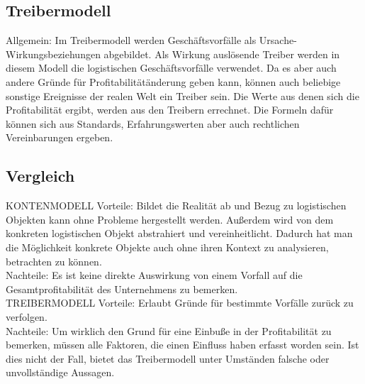 \subsection{Treibermodell}
Allgemein:
Im Treibermodell werden Geschäftsvorfälle als Ursache-Wirkungsbeziehungen abgebildet. Als Wirkung auslösende Treiber werden in diesem Modell die logistischen Geschäftsvorfälle verwendet. Da es aber auch andere Gründe für Profitabilitätänderung geben kann, können auch beliebige sonstige Ereignisse der realen Welt ein Treiber sein.
Die Werte aus denen sich die Profitabilität ergibt, werden aus den Treibern errechnet. Die Formeln dafür können sich aus Standards, Erfahrungswerten aber auch rechtlichen Vereinbarungen ergeben.

\subsection{Vergleich}
KONTENMODELL
Vorteile:
Bildet die Realität ab und Bezug zu logistischen Objekten kann ohne Probleme hergestellt werden. Außerdem wird von dem konkreten logistischen Objekt abstrahiert und vereinheitlicht. Dadurch hat man die Möglichkeit konkrete Objekte auch ohne ihren Kontext zu analysieren, betrachten zu können.
\\
Nachteile:
Es ist keine direkte Auswirkung von einem Vorfall auf die Gesamtprofitabilität des Unternehmens zu bemerken.
\\
TREIBERMODELL
Vorteile:
Erlaubt Gründe für bestimmte Vorfälle zurück zu verfolgen.
\\
Nachteile:
Um wirklich den Grund für eine Einbuße in der Profitabilität zu bemerken, müssen alle Faktoren, die einen Einfluss haben erfasst worden sein. Ist dies nicht der Fall, bietet das Treibermodell unter Umständen falsche oder unvollständige Aussagen.

